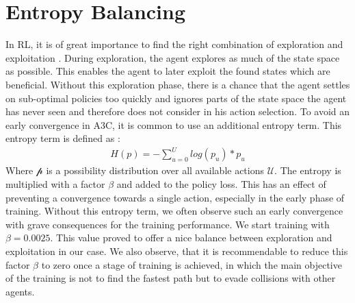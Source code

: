 \section{Entropy Balancing}\label{entropy_balancing_hyperparameter}
In RL, it is of great importance to find the right combination of exploration and exploitation \cite{explorationexploitation}. During exploration, the agent explores as much of the state space as possible. This enables the agent to later exploit the found states which are beneficial. Without this exploration phase, there is a chance that the agent settles on sub-optimal policies too quickly and ignores parts of the state space the agent has never seen and therefore does not consider in his action selection. To avoid an early convergence in A3C, it is common to use an additional entropy term. This entropy term is defined as \cite{a3c}:
\begin{gather*}
H(p) = -\sum_{u=0}^{U}log(p_{u})*p_{u}
\end{gather*}
Where $\mathcal{p}$ is a possibility distribution over all available actions $\mathcal{U}$. The entropy is multiplied with a factor $\beta$ and added to the policy loss. This has an effect of preventing a convergence towards a single action, especially in the early phase of training. Without this entropy term, we often observe such an early convergence with grave consequences for the training performance. We start training with $\beta=0.0025$. This value proved to offer a nice balance between exploration and exploitation in our case. We also observe, that it is recommendable to reduce this factor $\beta$ to zero once a stage of training is achieved, in which the main objective of the training is not to find the fastest path but to evade collisions with other agents.

